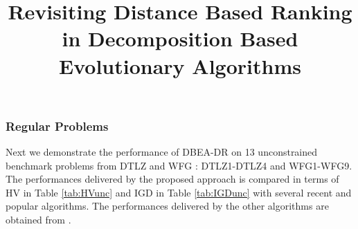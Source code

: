\documentclass[conference]{IEEEtran}
\begin{document}
 
\title{Revisiting Distance Based Ranking in Decomposition Based Evolutionary Algorithms}

\author{


}

\IEEEpeerreviewmaketitle
\maketitle

\thispagestyle{plain}

\subsubsection{Regular Problems}

Next we demonstrate the performance of DBEA-DR on 13 unconstrained benchmark problems from DTLZ \cite{deb2005scalable} and WFG \cite{huband2005scalable}: DTLZ1-DTLZ4 and WFG1-WFG9. The performances delivered by the proposed approach is compared in terms of HV in Table \ref{tab:HVunc} and IGD in Table \ref{tab:IGDunc} with several recent and popular algorithms. The performances delivered by the other algorithms are obtained from \cite{ishibuchi2016inverse}.  
\end{document}
